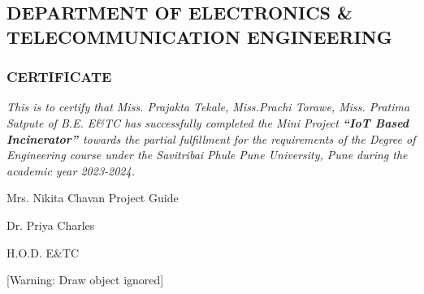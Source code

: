 \documentclass[letterpaper]{article}
\begin{document}
\bigskip


\bigskip


\bigskip


\bigskip


\bigskip

\subsection[DEPARTMENT OF ELECTRONICS \& TELECOMMUNICATION
ENGINEERING]{\textcolor[rgb]{0.42352942,0.17254902,0.62352943}{DEPARTMENT OF ELECTRONICS \& TELECOMMUNICATION
ENGINEERING}}

\bigskip


\bigskip


\bigskip

\subsubsection[CERTIFICATE]{\textcolor[rgb]{0.57254905,0.27450982,0.015686275}{CERTIFICATE}}

\bigskip


\bigskip

\textit{This is to certify that Miss. Prajakta Tekale, Miss.Prachi Torawe, Miss. Pratima Satpute of B.E. E\&TC has
successfully completed the Mini Project }\textbf{\textit{\textcolor[rgb]{0.0,0.4,0.6}{{}``IoT Based Incinerator''
}}}\textit{towards the partial fulfillment for the requirements of the Degree of Engineering course under the
Savitribai Phule Pune University, Pune during the academic year 2023-2024.}


\bigskip


\bigskip


\bigskip


\bigskip


\bigskip


\bigskip


\bigskip


\bigskip


\bigskip

\begin{multicols}{2}
\textcolor[rgb]{0.0,0.12156863,0.37254903}{Mrs. Nikita Chavan Project Guide}

{\centering
\textcolor[rgb]{0.0,0.12156863,0.37254903}{Dr. Priya Charles}
\par}

\textcolor[rgb]{0.0,0.12156863,0.37254903}{H.O.D. E\&TC}
\end{multicols}
[Warning: Draw object ignored]
\end{document}

